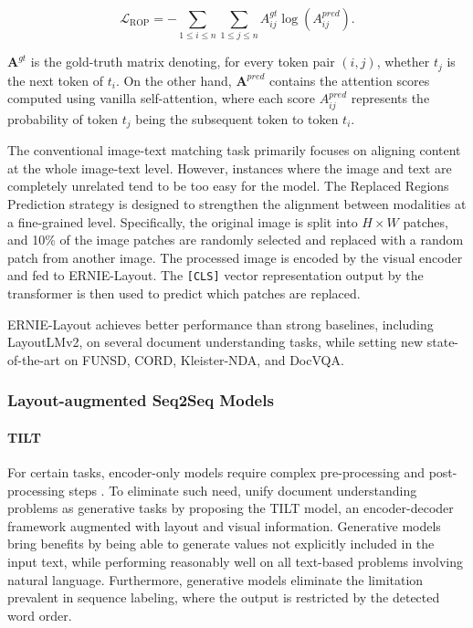 \begin{equation}
    \mathcal{L}_{\text{ROP}} = - \sum_{1 \leq i \leq n}\sum_{1 \leq j \leq n} A^{gt}_{ij} \log(A^{pred}_{ij}).
\end{equation}

\noindent $\bm{A}^{gt}$ is the gold-truth matrix denoting, for every token pair $(i, j)$, whether $t_j$ is the next token of $t_i$. On the other hand, $\bm{A}^{pred}$ contains the attention scores computed using vanilla self-attention, where each score $A^{pred}_{ij}$ represents the probability of token $t_j$ being the subsequent token to token $t_i$. 

\noindent The conventional image-text matching task primarily focuses on aligning content at the whole image-text level. However, instances where the image and text are completely unrelated tend to be too easy for the model. The Replaced Regions Prediction strategy is designed to strengthen the alignment between modalities at a fine-grained level. Specifically, the original image is split into $H \times W$ patches, and 10\% of the image patches are randomly selected and replaced with a random patch from another image. The processed image is encoded by the visual encoder and fed to ERNIE-Layout. The \texttt{[CLS]} vector representation output by the transformer is then used to predict which patches are replaced. 

ERNIE-Layout achieves better performance than strong baselines, including LayoutLMv2, on several document understanding tasks, while setting new state-of-the-art on FUNSD, CORD, Kleister-NDA, and DocVQA.


\subsubsection{Layout-augmented Seq2Seq Models}

\paragraph{TILT} 

For certain tasks, encoder-only models require complex pre-processing and post-processing steps \citep{gralinski2020kleister}. To eliminate such need, \citet{powalski2021going} unify document understanding problems as generative tasks by proposing the TILT model, an encoder-decoder framework augmented with layout and visual information. Generative models bring benefits by being able to generate values not explicitly included in the input text, while performing reasonably well on all text-based problems involving natural language. Furthermore, generative models eliminate the limitation prevalent in sequence labeling, where the output is restricted by the detected word order. 

